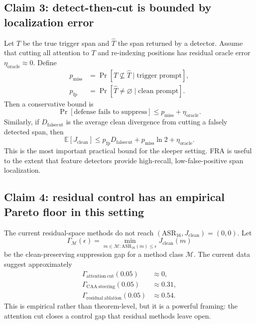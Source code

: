 \documentclass[11pt]{article}
\newcommand{\E}{\mathbb{E}}
\newcommand{\ASR}{\mathrm{ASR}_{16}}
\newcommand{\Jclean}{J_{\mathrm{clean}}}
\theoremstyle{definition}
\theoremstyle{plain}
\theoremstyle{remark}
\begin{document}
\subsection{Claim 3: detect-then-cut is bounded by localization error}

Let $T$ be the true trigger span and $\widehat T$ the span returned by a detector.
Assume that cutting all attention to $T$ and re-indexing positions has residual
oracle error $\eta_{\mathrm{oracle}}\approx 0$.  Define
\begin{align}
    p_{\mathrm{miss}} &= \Pr[T\nsubseteq \widehat T\mid\text{trigger prompt}],\\
    p_{\mathrm{fp}} &= \Pr[\widehat T\neq\varnothing\mid\text{clean prompt}].
\end{align}
Then a conservative bound is
\begin{equation}
    \Pr[\text{defense fails to suppress}]
    \le
    p_{\mathrm{miss}}+\eta_{\mathrm{oracle}}.
    \label{eq:asr_bound}
\end{equation}
Similarly, if $D_{\mathrm{falsecut}}$ is the average clean divergence from cutting
a falsely detected span, then
\begin{equation}
    \E[\Jclean]
    \le
    p_{\mathrm{fp}}D_{\mathrm{falsecut}}
    +p_{\mathrm{miss}}\ln 2
    +\eta_{\mathrm{oracle}}.
    \label{eq:j_bound}
\end{equation}
This is the most important practical bound for the sleeper setting.  FRA is
useful to the extent that feature detectors provide high-recall, low-false-positive
span localization.

\subsection{Claim 4: residual control has an empirical Pareto floor in this setting}

The current residual-space methods do not reach $(\ASR,\Jclean)=(0,0)$.  Let
\begin{equation}
    \Gamma_{\mathcal{M}}(\epsilon)
    =
    \min_{m\in\mathcal{M}:\ASR(m)\le\epsilon}\Jclean(m)
\end{equation}
be the clean-preserving suppression gap for a method class $\mathcal{M}$.  The
current data suggest approximately
\begin{align}
    \Gamma_{\mathrm{attention\ cut}}(0.05)&\approx 0,\\
    \Gamma_{\mathrm{CAA\ steering}}(0.05)&\approx 0.31,\\
    \Gamma_{\mathrm{residual\ ablation}}(0.05)&\approx 0.54.
\end{align}
This is empirical rather than theorem-level, but it is a powerful framing: the
attention cut closes a control gap that residual methods leave open.
\end{document}
